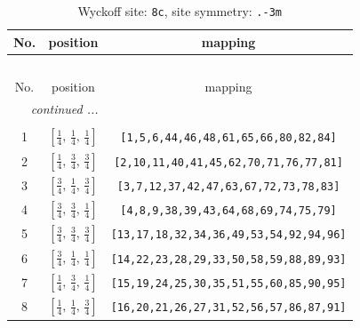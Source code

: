 \documentclass[fleqn,8pt]{jsarticle}
\begin{document}
\begin{longtable}{ccc}
\caption{Wyckoff site: {\tt 8c}, site symmetry: {\tt .-3m}}
 \\
 \hline \hline
No. & position & mapping \\ \hline \endfirsthead

\multicolumn{2}{l}{\tablename\ \thetable{}} \\
 \hline \hline
No. & position & mapping \\ \hline \endhead

 \hline \hline
\multicolumn{2}{r}{\footnotesize\it continued ...} \\ \endfoot

 \hline \hline
\multicolumn{2}{r}{} \\ \endlastfoot

1 & $\left[ \frac{1}{4},\, \frac{1}{4},\, \frac{1}{4} \right]$ & {\tt [1,5,6,44,46,48,61,65,66,80,82,84]} \\ \hline
2 & $\left[ \frac{1}{4},\, \frac{3}{4},\, \frac{3}{4} \right]$ & {\tt [2,10,11,40,41,45,62,70,71,76,77,81]} \\ \hline
3 & $\left[ \frac{3}{4},\, \frac{1}{4},\, \frac{3}{4} \right]$ & {\tt [3,7,12,37,42,47,63,67,72,73,78,83]} \\ \hline
4 & $\left[ \frac{3}{4},\, \frac{3}{4},\, \frac{1}{4} \right]$ & {\tt [4,8,9,38,39,43,64,68,69,74,75,79]} \\ \hline
5 & $\left[ \frac{3}{4},\, \frac{3}{4},\, \frac{3}{4} \right]$ & {\tt [13,17,18,32,34,36,49,53,54,92,94,96]} \\ \hline
6 & $\left[ \frac{3}{4},\, \frac{1}{4},\, \frac{1}{4} \right]$ & {\tt [14,22,23,28,29,33,50,58,59,88,89,93]} \\ \hline
7 & $\left[ \frac{1}{4},\, \frac{3}{4},\, \frac{1}{4} \right]$ & {\tt [15,19,24,25,30,35,51,55,60,85,90,95]} \\ \hline
8 & $\left[ \frac{1}{4},\, \frac{1}{4},\, \frac{3}{4} \right]$ & {\tt [16,20,21,26,27,31,52,56,57,86,87,91]} \\
\end{longtable}
\renewcommand{\arraystretch}{1.2}
\end{document}

